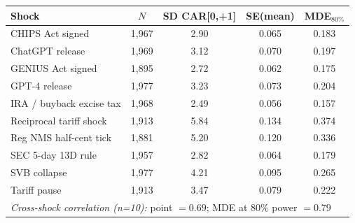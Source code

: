 \begin{tabular}{lcccc}
\toprule
Shock & $N$ & SD CAR[0,+1] & SE(mean) & MDE$_{80\%}$ \\
\midrule
CHIPS Act signed & 1,967 & 2.90 & 0.065 & 0.183 \\
ChatGPT release & 1,969 & 3.12 & 0.070 & 0.197 \\
GENIUS Act signed & 1,895 & 2.72 & 0.062 & 0.175 \\
GPT-4 release & 1,977 & 3.23 & 0.073 & 0.204 \\
IRA / buyback excise tax & 1,968 & 2.49 & 0.056 & 0.157 \\
Reciprocal tariff shock & 1,913 & 5.84 & 0.134 & 0.374 \\
Reg NMS half-cent tick & 1,881 & 5.20 & 0.120 & 0.336 \\
SEC 5-day 13D rule & 1,957 & 2.82 & 0.064 & 0.179 \\
SVB collapse & 1,977 & 4.21 & 0.095 & 0.265 \\
Tariff pause & 1,913 & 3.47 & 0.079 & 0.222 \\
\midrule \multicolumn{5}{l}{\emph{Cross-shock correlation (n=10):} point $=0.69$; MDE at 80\% power $=0.79$} \\
\bottomrule
\end{tabular}